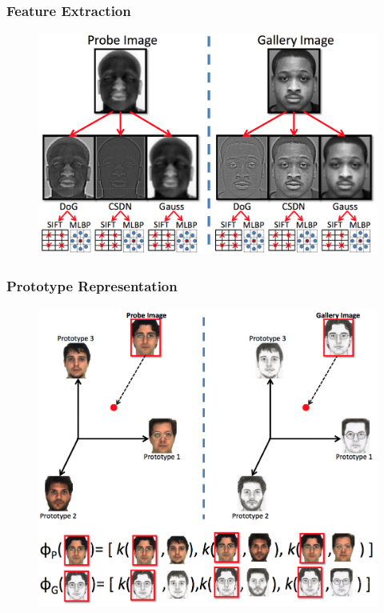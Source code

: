\documentclass{beamer}
\begin{document}
\begin{frame}
\frametitle{Feature Extraction}
\begin{figure}
\includegraphics[width=\textwidth]{featureextraction}
\end{figure}
\end{frame}

\begin{frame}
\frametitle{Prototype Representation}
\begin{figure}
\includegraphics[height=0.8\textheight]{prototypes}
\end{figure}
\end{frame}
\end{document}
